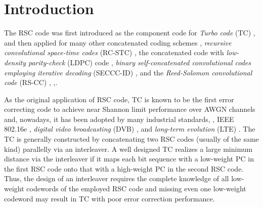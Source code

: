 \section{Introduction}

The RSC code was first introduced as the component code for {\it Turbo code} (TC) \cite{Berrou93-05C}, \cite{Thitimajshima95-11C} and then applied for many other concatenated coding schemes \eg, {\it recursive convolutional space-time codes} (RC-STC) \cite{Li05-07J}, the concatenated code with {\it low-density parity-check} (LDPC) code \cite{Gounai06-06C}, {\it binary self-concatenated convolutional codes employing iterative decoding} (SECCC-ID) \cite{Butt08-11C}, and the {\it Reed-Solomon convolutional code} (RS-CC) \cite{Xu07-04C}, \cite{Byun10-09C},\cite{Joshi11-11C}. 

As the original application of RSC code, TC is known to be the first error correcting code to achieve near Shannon limit performance over AWGN channels and, nowadays, it has been adopted by many industrial standards, \eg, IEEE 802.16e \cite{802-16e-04S}, {\it digital video broadcasting} (DVB) \cite{DVB-14S}, and {\it long-term evolution} (LTE) \cite{LTE-11S}.
The TC is generally constructed by concatenating two RSC codes (usually of the same kind) parallelly  via an interleaver. A well designed TC realizes a large minimum distance via the interleaver if it maps each bit sequence with a  low-weight PC in the first RSC code onto that with a high-weight PC in the second RSC code. Thus, the design of an interleaver requires the complete knowledge of all low-weight codewords of the employed RSC code and missing even one low-weight codeword may result in TC with poor error correction performance.


